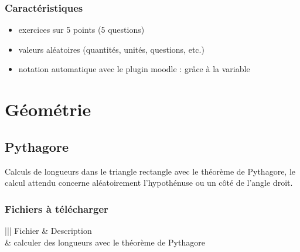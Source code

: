 \documentclass[letterpaper,10pt,french]{sphinxmanual}
\begin{document}
\subsection{Caractéristiques}
\label{\detokenize{analyse alg_xe8bre - fonctions:caracteristiques}}\begin{itemize}
\item {} 
exercices sur 5 points (5 questions)

\item {} 
valeurs aléatoires (quantités, unités, questions, etc.)

\item {} 
notation automatique avec le plugin moodle : grâce à la variable 

\end{itemize}


\chapter{Géométrie}
\label{\detokenize{index:geometrie}}

\section{Pythagore}
\label{\detokenize{geom-pythagore:pythagore}}\label{\detokenize{geom-pythagore::doc}}
Calculs de longueurs dans le triangle rectangle avec le théorème de Pythagore, le calcul
attendu concerne aléatoirement l’hypothénuse ou un côté de l’angle droit.



\subsection{Fichiers à télécharger}
\label{\detokenize{geom-pythagore:fichiers-a-telecharger}}

\begin{savenotes}\sphinxattablestart
\centering
{}
\label{\detokenize{geom-pythagore:id1}}
\sphinxaftercaption
\begin{tabular}[t]{|||}
\hline
\sphinxstyletheadfamily 
Fichier
&\sphinxstyletheadfamily 
Description
\\
\hline
{}
&
calculer des longueurs avec le théorème de Pythagore
\\
\hline
\end{tabular}
\par
\sphinxattableend\end{savenotes}
\end{document}

